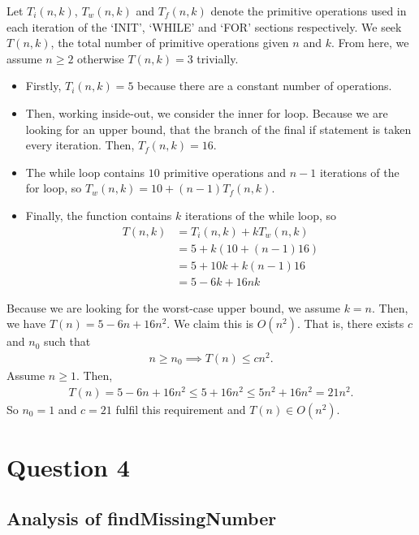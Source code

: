 \documentclass[11pt,a4paper]{article} %
\begin{document}
Let $T_i(n, k)$, $T_w(n, k)$ and $T_f(n, k)$ denote the primitive operations used in 
each iteration of the `INIT', `WHILE' and `FOR' sections respectively. We seek $T(n, k)$, the total
number of primitive operations given $n$ and $k$. From here, we assume $n \ge 2$
otherwise $T(n, k) = 3$ trivially.
\begin{itemize}
    \item Firstly, $T_i(n, k) = 5$ because there are a constant number of operations.
    \item Then, working inside-out, we consider the inner for loop. Because we are looking for
    an upper bound, that the branch of the final if statement is taken every iteration.
    Then, $T_f(n, k) = 16$.
    \item The while loop contains $10$ primitive operations and $n-1$ iterations of the for loop, so 
    $T_w(n, k) = 10 + (n-1)T_f(n, k)$.
    \item Finally, the function contains $k$ iterations of the while loop, so 
    \begin{align*}
        T(n, k) &= T_i(n, k) + k T_w(n, k) \\ 
        &= 5 + k(10 + (n-1)16) \\ 
        &= 5 + 10k + k(n-1)16 \\ 
        &= 5 - 6k + 16nk
    \end{align*}
\end{itemize}
Because we are looking for the worst-case upper bound, we assume $k = n$. Then, we have 
$T(n) = 5 - 6n + 16n^2$. We claim this is $O(n^2)$. That is, there exists $c$ and $n_0$ such that 
\begin{align*}
    n \ge n_0 \implies T(n) \le cn^2.
\end{align*}
Assume $n \ge 1$. Then,
\begin{align*}
    T(n) = 5 - 6n + 16n^2 \le 5 + 16n^2 \le 5n^2 + 16n^2 = 21n^2.
\end{align*}
So $n_0 = 1$ and $c = 21$ fulfil this requirement and $T(n) \in O(n^2)$.



\section*{Question 4}
\subsection*{Analysis of {findMissingNumber}}
\end{document}
